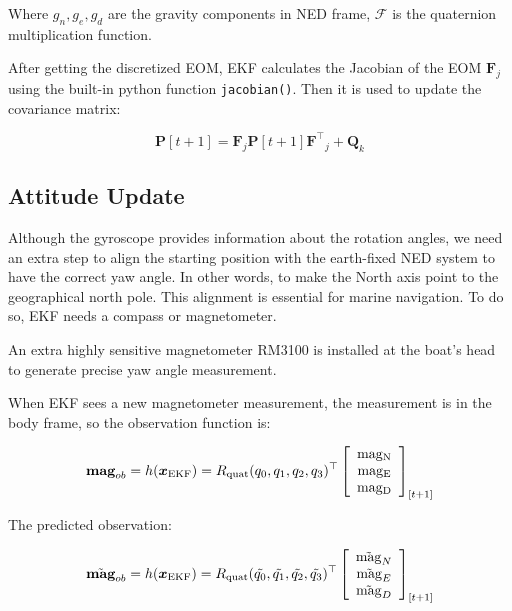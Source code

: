 Where $g_n,g_e,g_d$ are the gravity components in NED frame, $\mathcal{F}$ is the quaternion multiplication function.


After getting the discretized EOM, EKF calculates the Jacobian of the EOM $\boldsymbol{F}_j$ using the built-in python function \lstinline|jacobian()|. Then it is used to update the covariance matrix:

\begin{equation}
    \boldsymbol{P}[t+1]=\boldsymbol{F}_j \boldsymbol{P}[t+1] {\boldsymbol{F}^\top}_j+\boldsymbol{Q}_k
\end{equation}

\subsection{Attitude Update}

Although the gyroscope provides information about the rotation angles, we need an extra step to align the starting position with the earth-fixed NED system to have the correct yaw angle. In other words, to make the North axis point to the geographical north pole. This alignment is essential for marine navigation. To do so, EKF needs a compass or magnetometer.

An extra highly sensitive magnetometer RM3100 is installed at the boat's head to generate precise yaw angle measurement.  

When EKF sees a new magnetometer measurement, the measurement is  in the body frame, so the observation function is:

\begin{equation}
    \textbf{mag}_{ob}=h(\boldsymbol{x}_{\rm EKF})=R_{\rm quat}(q_0,q_1,q_2,q_3)^\top \left[\begin{array}{c}
            \rm mag_N  \\
            \rm mag_E  \\
            \rm mag_D
        \end{array}\right]_{[t+1]}
\end{equation}

The predicted observation:

\begin{equation}
    \Tilde{\textbf{mag}}_{ob}=h(\boldsymbol{x}_{\rm EKF})=R_{\rm quat}(\Tilde{q_0},\Tilde{q_1},\Tilde{q_2},\Tilde{q_3})^\top \left[\begin{array}{c}
            \Tilde{\rm mag}_N  \\
            \Tilde{\rm mag}_E  \\
            \Tilde{\rm mag}_D
        \end{array}\right]_{[t+1]}
\end{equation}

